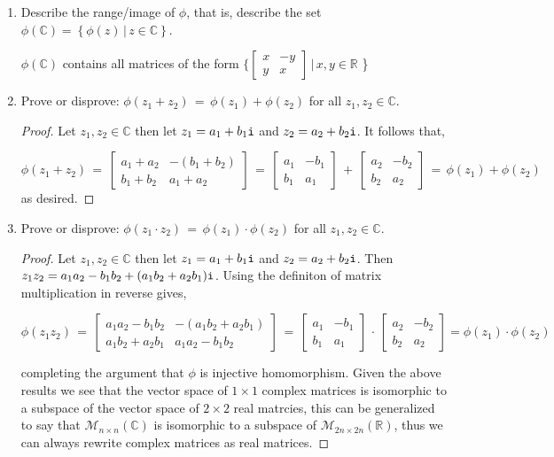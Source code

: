 \documentclass[11pt,table]{article}
\newcommand {\mat}  [1] {\left[\begin{array}{#1}}
\newcommand {\rix}      {\end{array}\right]}
\newcommand{\<}			{\langle}
\renewcommand{\>}      		{\rangle}
\newcommand{\bC}		{\mathbb{C}}
\newcommand{\bR}		{\mathbb{R}}
\begin{document}
\begin{enumerate}
\begin{enumerate}[\rm (a)]
\item 
Describe the range/image of $\phi$, that is, 
describe the set $\phi(\bC) = \left\{ \phi(z) \, | \, z \in \bC \right\}$. 

$\phi(\bC) $ contains all matrices of the form $\Big\{ \mat{rr} x & -y \\ y & x \rix \, | \, x, y \in \bR$ \Big\} 

\item 
Prove or disprove: $\phi (z_1 + z_2) \, = \, \phi(z_1) + \phi(z_2)$ 
for all $z_1, z_2 \in \bC$. 


\begin{proof}
	Let $z_1, z_2 \in \bC$ then let $z_1 = a_1 + b_1{\tt i}$ and $z_2 = a_2 + b_2{\tt i}$. 
	It follows that, 
	
	\begin{equation}
		\phi(z_1 + z_2) 
		\, = \, 
		\mat{rr}
		a_1 + a_2 & -(b_1 + b_2) \\
		b_1 + b_2 & a_1 + a_2
		\rix 
		\, = \, 
		\mat{rr}
		a_1 & -b_1 \\
		b_1 & a_1 
		\rix
		\, + \, 
		\mat{rr}
		a_2 & -b_2 \\
		b_2 & a_2
		\rix 
		\, = \, 
		\phi(z_1) + \phi(z_2)
	\end{equation}
	as desired. 
\end{proof}

\item 
Prove or disprove: $\phi (z_1 \cdot z_2) \, = \, \phi(z_1) \cdot \phi(z_2)$ 
for all $z_1, z_2 \in \bC$. 

\begin{proof}
	Let $z_1, z_2 \in \bC$ then let $z_1 = a_1 + b_1{\tt i}$ and $z_2 = a_2 + b_2{\tt i}$. 
	Then $z_1z_2 = a_1a_2 - b_1b_2 + (a_1b_2 + a_2b_1){\tt i}$. Using the definiton of matrix multiplication 
	in reverse gives,
	
	\begin{equation}
		\phi(z_1z_2) 
		\, = \, 
		\mat{rr}
		a_1a_2 - b_1b_2 & -(a_1b_2 + a_2b_1) \\
		a_1b_2 + a_2b_1 & a_1a_2 - b_1b_2 
		\rix 
		\, = \, 
		\mat{rr}
		a_1 & -b_1 \\ 
		b_1 & a_1 
		\rix 
		\, \cdot \, 
		\mat{rr}
		a_2 & -b_2 \\ 
		b_2 & a_2 
		\rix 
		= \phi(z_1) \cdot \phi(z_2)
	\end{equation}

	completing the argument that $\phi$ is injective homomorphism. Given the above results we see that the vector space of $1 \times 1$ complex matrices is isomorphic 
	to a subspace of the vector space of $2 \times 2$ real matrcies, this can be generalized to say that 
	$\mathcal{M}_{n \times n}(\bC)$ is isomorphic to a subspace of $\mathcal{M} _{2n \times 2n}(\bR)$, thus we can always rewrite complex matrices as 
	real matrices. 


\end{proof}
\end{enumerate}
\end{enumerate}
\end{document}
